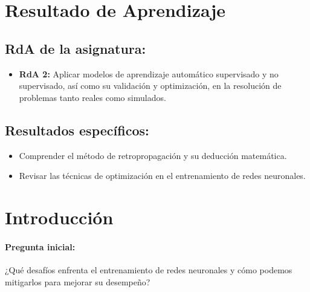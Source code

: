 \documentclass[a4,11pt]{aleph-notas}
\begin{document}
\encabezado


\section*{Resultado de Aprendizaje}

\subsection*{RdA de la asignatura:}
\begin{itemize}[leftmargin=*]
    \item \textbf{RdA 2:} Aplicar modelos de aprendizaje automático supervisado y no supervisado, así como su validación y optimización, en la resolución de problemas tanto reales como simulados.
\end{itemize}

\subsection*{Resultados específicos:}  
\begin{itemize}[leftmargin=*]  
    \item Comprender el método de retropropagación y su deducción matemática.  
    \item Revisar las técnicas de optimización en el entrenamiento de redes neuronales.  
\end{itemize}  

\section*{Introducción}  

\paragraph{Pregunta inicial:}  
¿Qué desafíos enfrenta el entrenamiento de redes neuronales y cómo podemos mitigarlos para mejorar su desempeño?  
\end{document}

